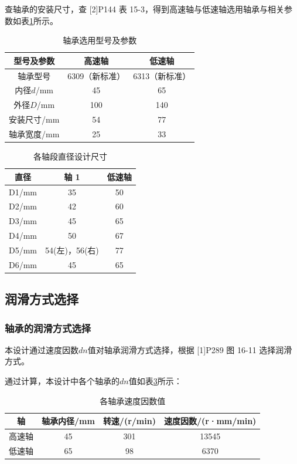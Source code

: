 \documentclass[12pt]{ctexart}
\begin{document}
查轴承的安装尺寸，查 [2]P144 表 15-3，得到高速轴与低速轴选用轴承与相关参数如表\ref{table10}所示。
\begin{table}[htbp]
    \centering
    \begin{tabular}{c c c}
        \toprule
        型号及参数 & 高速轴& 低速轴\\
        \midrule
        轴承型号 & 6309（新标准） & 6313（新标准） \\
        内径$d$/mm & 45 & 65 \\
        外径$D$/mm & 100 & 140 \\
        安装尺寸/mm & 54 & 77 \\
        轴承宽度/mm & 25 & 33 \\
        \bottomrule
    \end{tabular}
    \caption{轴承选用型号及参数}
    \label{table10}
\end{table}


\begin{table}[htbp]
    \centering
    \begin{tabular}{c c c}
        \toprule
        直径 & 轴 1& 低速轴\\
        \midrule
        D1/mm & 35 & 50 \\
        D2/mm & 42 & 60 \\
        D3/mm & 45 & 65 \\
        D4/mm & 50 & 67 \\
        D5/mm & 54(左)，56(右) & 77 \\
        D6/mm & 45 & 65 \\
        \bottomrule
    \end{tabular}
    \caption{各轴段直径设计尺寸}
    \label{table9}
\end{table}

\subsection{润滑方式选择}

\subsubsection{轴承的润滑方式选择}

本设计通过速度因数$dn$值对轴承润滑方式选择，根据 [1]P289 图 16-11 选择润滑方式。

通过计算，本设计中各个轴承的$dn$值如表\ref{table12}所示：

\begin{table}[htbp]
    \centering
    \begin{tabular}{c c c c}
        \toprule
        轴 & 轴承内径/mm & 转速/(r/min) & 速度因数/(r·mm/min)\\
        \midrule
        高速轴 & 45 & 301 & 13545 \\
        低速轴 & 65 & 98  & 6370  \\
        \bottomrule
    \end{tabular}
    \caption{各轴承速度因数值}
    \label{table12}
\end{table}
\end{document}
